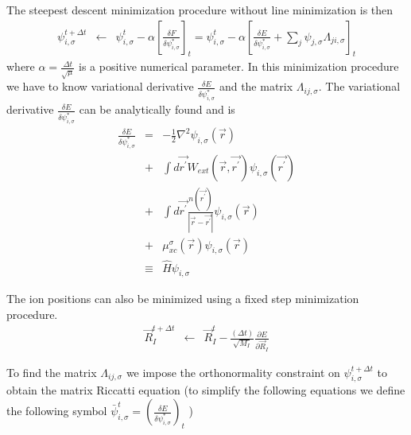 \noindent
The steepest descent minimization procedure without line minimization
is then
\begin{eqnarray}
\psi_{i,\sigma}^{t+ \Delta t} 
                   &\leftarrow& 
                    \psi_{i,\sigma}^{t} 
                      - \alpha 
                        \left[ 
                           \frac{\delta F}{\delta \psi_{i,\sigma}^{*}}
                        \right]_{t}
                   = \psi_{i,\sigma}^{t} 
                      - \alpha 
                        \left[ 
                           \frac{\delta E}{\delta \psi_{i,\sigma}^{*}}
                            + \sum_{j} \psi_{j,\sigma} \Lambda_{ji,\sigma} 
                        \right]_{t}
\label{eq:sd2}
\end{eqnarray}
where $\alpha =\frac{\Delta t}{\sqrt{\mu}}$ is a positive numerical parameter.
In this minimization procedure we have to know variational derivative
$\frac{\delta E}{\delta \psi_{i,\sigma}^{*}}$ and the matrix 
$\Lambda_{ij,\sigma}$. 
The variational derivative $\frac{\delta E}{\delta \psi_{i,\sigma}^{*}}$ 
can be analytically found and is
\begin{eqnarray}
\frac{\delta E}{\delta \psi_{i,\sigma}^{*}} 
      &=&  -\frac{1}{2} \nabla^2 
            \psi_{i,\sigma}(\vec{r}) \nonumber \\
      &+& \int d\vec{r^{\prime}} 
           W_{ext}(\vec{r},\vec{r^{\prime}}) 
          \psi_{i,\sigma}(\vec{r^{\prime}}) \nonumber \\
      &+& \int d\vec{r^{\prime}} 
                    \frac{n(\vec{r^{\prime}})}{|\vec{r}-\vec{r^{\prime}}|}
          \psi_{i,\sigma}(\vec{r}) \nonumber \\
      &+& \mu_{xc}^{\sigma}(\vec{r}) 
          \psi_{i,\sigma}(\vec{r}) \nonumber \\
& \equiv & \hat{H} \psi_{i,\sigma}
\label{eq:sd3}
\end{eqnarray}
  
The ion positions can also be minimized using a fixed step minimization 
procedure.
\begin{eqnarray}
\vec{R}_I^{t+\Delta t} &\leftarrow& 
                      \vec{R}_I^{t}
                    - \frac{(\Delta t)}{\sqrt{M_I}} 
                       \frac{\partial E}{\partial \vec{R}_I}
\end{eqnarray}
                      
\noindent
To find the matrix $\Lambda_{ij,\sigma}$ we impose the orthonormality
constraint on $\psi_{i,\sigma}^{t+\Delta t}$ to obtain the
matrix Riccatti equation 
(to simplify the following equations we define the following symbol
$\bar{\psi}_{i,\sigma}^{t} =  
              \left(\frac{\delta E}{\delta \psi_{i,\sigma}^{*}} \right)_{t}$
)


